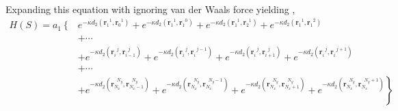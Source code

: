 \documentclass{article}
\begin{document}
Expanding this equation with ignoring van der Waals force yielding , 
\begin{equation}
  \begin{aligned}
    H (S) = a_1 \left\{\right.&e^{-\kappa d_2 (\bm{r}_{1}^{\mspace{10mu}1}, \bm{r}_{0}^{\mspace{10mu}1})}
   + e^{-\kappa d_2 (\bm{r}_{1}^{\mspace{10mu}1}, \bm{r}_{1}^{\mspace{10mu}0})} 
   + e^{-\kappa d_2 (\bm{r}_{1}^{\mspace{10mu}1}, \bm{r}_{2}^{\mspace{10mu}1})} 
   + e^{-\kappa d_2 (\bm{r}_{1}^{\mspace{10mu}1}, \bm{r}_{1}^{\mspace{10mu}2})} \\
   &+ \cdots \\
   &+ e^{-\kappa d_2 (\bm{r}_{i}^{\mspace{10mu}j}, \bm{r}_{i-1}^{\mspace{10mu}j})} 
   + e^{-\kappa d_2 (\bm{r}_{i}^{\mspace{10mu}j}, \bm{r}_{i}^{\mspace{10mu}j-1})} 
   + e^{-\kappa d_2 (\bm{r}_{i}^{\mspace{10mu}j}, \bm{r}_{i+1}^{\mspace{10mu}j})} 
   + e^{-\kappa d_2 (\bm{r}_{i}^{\mspace{10mu}j}, \bm{r}_{i}^{\mspace{10mu}j+1})} \\
   &+ \cdots \\
   &+ e^{-\kappa d_2 (\bm{r}_{N_x}^{\mspace{10mu}N_y}, \bm{r}_{N_x-1}^{\mspace{10mu}N_y})} 
   + e^{-\kappa d_2 (\bm{r}_{N_x}^{\mspace{10mu}N_y}, \bm{r}_{N_x}^{\mspace{10mu}N_y-1})} 
   + e^{-\kappa d_2 (\bm{r}_{N_x}^{\mspace{10mu}N_y}, \bm{r}_{N_x+1}^{\mspace{10mu}N_y})} 
   + e^{-\kappa d_2 (\bm{r}_{N_x}^{\mspace{10mu}N_y}, \bm{r}_{N_x}^{\mspace{10mu}N_y+1})}\left.\right\}
  \end{aligned}
\end{equation}
\end{document}
